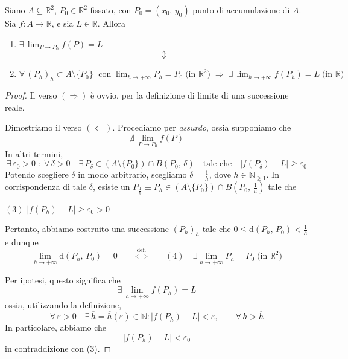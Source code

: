 \begin{thm}
Siano $A \subseteq \mathbb{R}^2$, $P_0 \in \mathbb{R}^2$ fissato, con $P_0=(x_0,\, y_0)$ punto di accumulazione di $A$. Sia $f : A \longrightarrow \mathbb{R}$, e sia $L \in \mathbb{R}$. Allora
\begin{enumerate}[labelindent=\parindent,leftmargin=*,label=\textnormal{(\arabic*)},start=1]
\item \hfill $\displaystyle \exists \, \lim_{P \rightarrow P_0} f(P) = L$ \hfill \null
$$\Updownarrow$$
\item
\hfill
$\displaystyle \forall \, (P_h)_h \subset A \setminus \lbrace P_0 \rbrace \; \text{ con} \; \lim_{h \rightarrow +\infty} P_h = P_0 \; \text{(in } \mathbb{R}^2 \text{)} \; \Longrightarrow \; \exists \, \lim_{h \rightarrow +\infty} f(P_h) = L \; \text{(in } \mathbb{R} \text{)}$
\hfill \null
\end{enumerate}
\begin{center}
\def\svgwidth{15cm}

\end{center}

\end{thm}
\begin{proof}
Il verso $(\Rightarrow)$ è ovvio, per la definizione di limite di una successione reale.

Dimostriamo il verso $(\Leftarrow)$. Procediamo per \emph{assurdo}, ossia supponiamo che
$$\nexists \, \lim_{P \rightarrow P_0} f(P)$$
In altri termini,
$$\exists \, \varepsilon_0 > 0 \; : \; \forall \, \delta > 0 \quad \exists \, P_{\delta} \in (A \setminus \lbrace P_0 \rbrace) \cap B(P_0,\, \delta) \quad \text{tale che} \quad |f(P_{\delta}) - L| \geq \varepsilon_0$$
Potendo scegliere $\delta$ in modo arbitrario, scegliamo $\delta=\frac{1}{h}$, dove $h \in \mathbb{N}_{\geq 1}$. In corrispondenza di tale $\delta$, esiste un $P_{\frac{1}{h}} \equiv P_h \in (A \setminus \lbrace P_0 \rbrace) \cap B(P_0,\, \frac{1}{h})$ tale che
\begin{center}
$\mathrm{(3)}$
\hfill
$\displaystyle |f(P_h) - L| \geq \varepsilon_0 > 0$
\hfill \null
\end{center}
Pertanto, abbiamo costruito una successione $(P_h)_h$ tale che $0 \leq \mathrm{d}(P_h,\, P_0) < \frac{1}{h}$ e dunque
$$\lim_{h \rightarrow +\infty} \mathrm{d}(P_h,\, P_0) = 0 \qquad \overset{\text{def.}}{\Longleftrightarrow} \qquad \mathrm{(4)} \quad \exists \lim_{h \rightarrow +\infty} P_h = P_0 \; \text{(in } \mathbb{R}^2 \text{)}$$
\begin{center}
\def\svgwidth{6cm}

\end{center}
Per ipotesi, questo significa che
$$\exists \, \lim_{h \rightarrow +\infty} f(P_h) = L$$
ossia, utilizzando la definizione, 
$$\forall \, \varepsilon > 0 \quad \exists \, \overline{h} = \overline{h}(\varepsilon) \in \mathbb{N} : |f(P_h) - L| < \varepsilon, \qquad \forall \, h > \overline{h}$$
In particolare, abbiamo che
$$|f(P_h) - L| < \varepsilon_0$$
in contraddizione con \textnormal{(3)}.
\end{proof}

